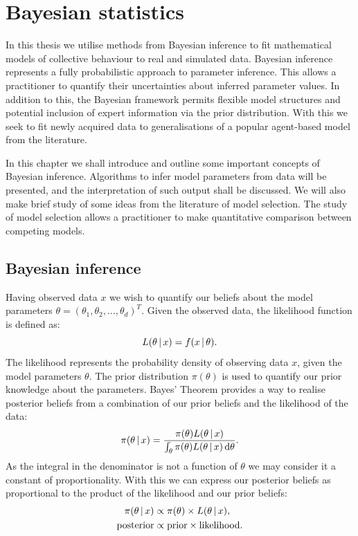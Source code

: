 \graphicspath{{fig/bayes_intro/}}

\chapter{Bayesian statistics}
\label{cha:bayes_intro}

In this thesis we utilise methods from Bayesian inference to fit mathematical
models of collective behaviour to real and simulated data. Bayesian inference
represents a fully probabilistic approach to parameter inference. This allows a
practitioner to quantify their uncertainties about inferred parameter values.
In addition to this, the Bayesian framework permits flexible model structures
and potential inclusion of expert information via the prior distribution. With
this we seek to fit newly acquired data to generalisations of a popular
agent-based model from the literature.

In this chapter we shall introduce and outline some important concepts of
Bayesian inference. Algorithms to infer model parameters from data will be
presented, and the interpretation of such output shall be discussed. We will
also make brief study of some ideas from the literature of model selection. The
study of model selection allows a practitioner to make quantitative
comparison between competing models.

\section{Bayesian inference}
\label{sec:bayesian_inference}

Having observed data $x$ we wish to quantify our beliefs about the model
parameters $\theta = (\theta_1,\theta_2,\dots,\theta_d)^T$. Given the observed
data, the likelihood function is defined as:
\begin{equation}
  L(\theta \,|\, x) = f(x \,|\,\theta).
\end{equation}
The likelihood represents the probability density of observing data $x$, given
the model parameters $\theta$. The prior distribution $\pi(\theta)$ is used to
quantify our prior knowledge about the parameters. Bayes' Theorem provides a
way to realise posterior beliefs from a combination of our prior beliefs and
the likelihood of the data:
\begin{equation}
  \label{eq:bayes_theorem}
  \pi(\theta \given x) =
    \frac{\pi(\theta) L(\theta\given x)}%
         {\int_{\theta} \pi(\theta) L(\theta\given x) \, \textup{d}\theta}.
\end{equation}
As the integral in the denominator is not a function of $\theta$ we may
consider it a constant of proportionality. With this we can express our
posterior beliefs as proportional to the product of the likelihood and our
prior beliefs:
\begin{align*}
  \pi(\theta\,|\, x) & \propto \pi(\theta) \times L(\theta\,|\, x), \\
  \text{posterior}    & \propto \text{prior} \times \text{likelihood}.
\end{align*}


